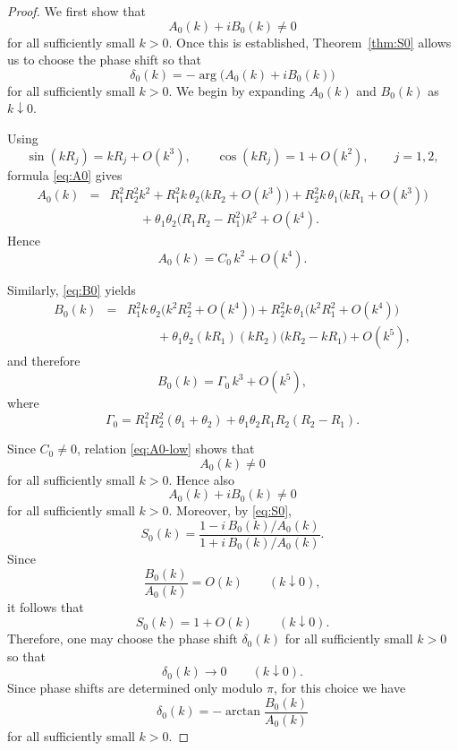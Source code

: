 \documentclass[a4paper,11pt]{article}
\numberwithin{equation}{section}
\theoremstyle{definition}
\theoremstyle{remark}
\begin{document}
\begin{proof}
We first show that
\[
A_0(k)+iB_0(k)\neq0
\]
for all sufficiently small $k>0$.
Once this is established, Theorem~\ref{thm:S0} allows us to choose the phase
shift so that
\[
\delta_0(k)=-\arg\bigl(A_0(k)+iB_0(k)\bigr)
\]
for all sufficiently small $k>0$.
We begin by expanding $A_0(k)$ and $B_0(k)$ as $k\downarrow0$.

Using
$$
\sin(kR_j)=kR_j+O(k^3),
\qquad
\cos(kR_j)=1+O(k^2),
\qquad
j=1,2,
$$
formula \eqref{eq:A0} gives
\begin{eqnarray}
A_0(k)
&=&
R_1^2R_2^2k^2
+
R_1^2k\,\theta_2\bigl(kR_2+O(k^3)\bigr)
+
R_2^2k\,\theta_1\bigl(kR_1+O(k^3)\bigr)
\nonumber\\
&&\hspace{1cm}
+
\theta_1\theta_2\bigl(R_1R_2-R_1^2\bigr)k^2
+
O(k^4).
\label{eq:A0-low-expand1}
\end{eqnarray}
Hence
\begin{equation}\label{eq:A0-low}
A_0(k)=C_0\,k^2+O(k^4).
\end{equation}

Similarly, \eqref{eq:B0} yields
\begin{eqnarray}
B_0(k)
&=&
R_1^2k\,\theta_2\bigl(k^2R_2^2+O(k^4)\bigr)
+
R_2^2k\,\theta_1\bigl(k^2R_1^2+O(k^4)\bigr)
\nonumber\\
&&\hspace{1cm}
+
\theta_1\theta_2
(kR_1)(kR_2)\bigl(kR_2-kR_1\bigr)
+
O(k^5),
\label{eq:B0-low-expand1}
\end{eqnarray}
and therefore
\begin{equation}\label{eq:B0-low}
B_0(k)=\Gamma_0\,k^3+O(k^5),
\end{equation}
where
\begin{equation}\label{eq:Gamma0}
\Gamma_0
=
R_1^2R_2^2(\theta_1+\theta_2)
+
\theta_1\theta_2R_1R_2(R_2-R_1).
\end{equation}

Since $C_0\neq0$, relation \eqref{eq:A0-low} shows that
$$
A_0(k)\neq0
$$
for all sufficiently small $k>0$. 
Hence also
$$
A_0(k)+iB_0(k)\neq0
$$
for all sufficiently small $k>0$. Moreover, by \eqref{eq:S0},
$$
S_0(k)
=
\frac{1-i\,B_0(k)/A_0(k)}{1+i\,B_0(k)/A_0(k)}.
$$
Since
$$
\frac{B_0(k)}{A_0(k)}=O(k)
\qquad (k\downarrow0),
$$
it follows that
$$
S_0(k)=1+O(k)
\qquad (k\downarrow0).
$$
Therefore, one may choose the phase shift $\delta_0(k)$ for all sufficiently
small $k>0$ so that
$$
\delta_0(k)\to0
\qquad (k\downarrow0).
$$
Since phase shifts are determined only modulo $\pi$, for this choice we have
\begin{equation}\label{eq:delta-arctan}
\delta_0(k)
=
-\arctan\!\frac{B_0(k)}{A_0(k)}
\end{equation}
for all sufficiently small $k>0$.


\end{proof}
\end{document}
